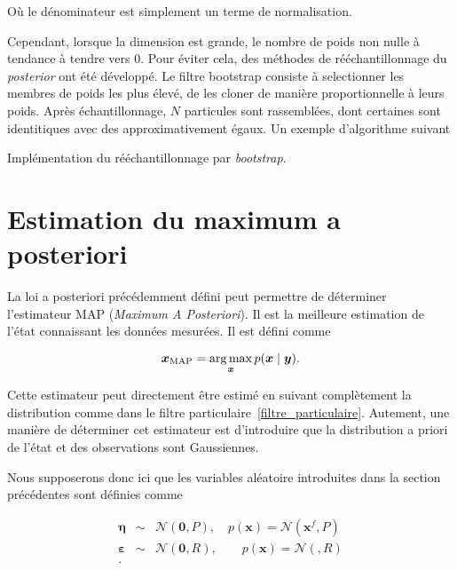 Où le dénominateur est simplement un terme de normalisation.

Cependant, lorsque la dimension est grande, le nombre de poids non nulle à tendance à tendre vers 0. Pour éviter cela, des méthodes de rééchantillonnage du \textit{posterior} ont été développé. Le filtre bootstrap \cite{gordon_1993} consiste à selectionner les membres de poids les plus élevé, de les cloner de manière proportionnelle à leurs poids. Après échantillonnage, $N$ particules sont rassemblées, dont certaines sont identitiques avec des approximativement égaux.
Un exemple d'algorithme suivant

\begin{algorithm}
    \caption{Implémentation du rééchantillonnage par \textit{bootstrap}.}
    \For{membre $n$ do}{
    Tirer $u$ dans $\mathcal{U}[0,1[$\;
    Initialiser $j=1$\;
    Affecter $S_w = w^1$\;
    \While{$S_w < u$}{
        $j = j+1$\;
        $S_w = S_w + w(j)\;$
    }
    Le membre $j$  est conservé et remplace le membre $n$.
    }
\end{algorithm}

\section{Estimation du maximum a posteriori}

La loi a posteriori précédemment défini peut permettre de déterminer l'estimateur MAP (\textit{Maximum A Posteriori}). Il est la meilleure estimation de l'état connaissant les données mesurées. Il est défini comme

\begin{equation*}
    \bm x_{\text{MAP}} = \operatorname*{arg\,max}_{\bm x} p(\bm x \mid \bm y).
\end{equation*}

Cette estimateur peut directement être estimé en suivant complètement la distribution comme dans le filtre particulaire~\ref{filtre_particulaire}.
Autement, une manière de déterminer cet estimateur est d'introduire que la distribution a priori de l'état et des observations sont Gaussiennes.

Nous supposerons donc ici que les variables aléatoire introduites dans la section précédentes sont définies comme

\begin{eqnarray*}
    \bm \eta &\sim& \mathcal{N}(\bm 0, P), \quad p(\bm x) = \mathcal{N}(\bm x^f, P)\\
    \bm \varepsilon & \sim & \mathcal N(\bm 0, R), \quad \quad p(\bm x) = \mathcal{N}(\bm , R)\\.
\end{eqnarray*}

